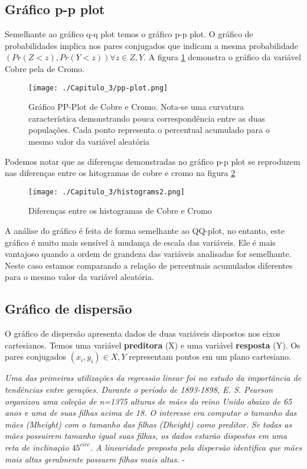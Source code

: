 \subsection{Gráfico p-p plot}

Semelhante ao gráfico q-q plot temos o gráfico p-p plot. O gráfico de probabilidades implica nos pares conjugados que indicam a mesma probabilidade $\left(Pr(Z<z),Pr(Y<z)\right) \forall z \in Z,Y $. A figura \ref{ppplot} demonstra o gráfico da variável Cobre pela de Cromo. 

\FloatBarrier
\begin{figure}[!htb]
	\centering
	\texttt{[image: ./Capitulo\_3/pp-plot.png]}	
	\caption{Gráfico PP-Plot de Cobre e Cromo. Nota-se uma curvatura característica demonstrando pouca correspondência entre as duas populações. Cada ponto representa o percentual acumulado para o mesmo valor da variável aleatória }
	\label{ppplot}
\end{figure} 
\FloatBarrier

Podemos notar que as diferenças demonstradas no gráfico p-p plot se reproduzem nas diferenças entre os hitogramas de cobre e cromo na figura \ref{histograms2}

\FloatBarrier
\begin{figure}[!htb]
	\centering
	\texttt{[image: ./Capitulo\_3/histograms2.png]}	
	\caption{Diferenças entre os histogramas de Cobre e Cromo}
	\label{histograms2}
\end{figure}
\FloatBarrier

A análise do gráfico é feita de forma semelhante ao QQ-plot, no entanto, este gráfico é muito mais sensível à mudança de escala das variáveis. Ele é mais vantajoso quando a ordem de grandeza das variáveis analisadas for semelhante. Neste caso estamos comparando a relação de percentuais acumulados diferentes para o mesmo valor da variável aleatória. 

\subsection{Gráfico de dispersão}
  
O gráfico de dispersão apresenta dados de duas variáveis dispostos nos eixos cartesianos. Temos uma variável \textbf{preditora} (X) e uma variável \textbf{resposta} (Y). Os pares conjugados $(x_{i}, y_{i}) \in X,Y$ representam pontos em um plano cartesiano.

\begin{proposition}
	\textit{Uma das primeiras utilizações da regressão linear foi no estudo da importância de tendências entre gerações. Durante o período de 1893-1898, E. S. Pearson organizou uma coleção de n=1375 alturas de mães do reino Unido abaixo de 65 anos e uma de suas filhas acima de 18. O interesse era computar o tamanho das mães (Mheight) com o tamanho das filhas (Dheight) como preditor. Se todas as mães possuirem tamanho igual suas filhas, os dados estarão dispostos em uma reta de inclinação $45^{circ}$. A linearidade proposta pela dispersão identifica que mães mais altas geralmente possuem filhas mais altas.} - \cite{weisberg2005applied}
\end{proposition}

